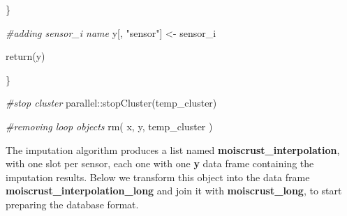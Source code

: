 \documentclass[
  table]{article}
\newenvironment{Shaded}{\begin{snugshade}}{\end{snugshade}}
\newcommand{\CommentTok}[1]{\textcolor[rgb]{0.56,0.35,0.01}{\textit{#1}}}
\newcommand{\FunctionTok}[1]{\textcolor[rgb]{0.00,0.00,0.00}{#1}}
\newcommand{\NormalTok}[1]{#1}
\newcommand{\OtherTok}[1]{\textcolor[rgb]{0.56,0.35,0.01}{#1}}
\newcommand{\SpecialCharTok}[1]{\textcolor[rgb]{0.00,0.00,0.00}{#1}}
\newcommand{\StringTok}[1]{\textcolor[rgb]{0.31,0.60,0.02}{#1}}
\begin{document}
\begin{Shaded}
\begin{Highlighting}[]
\NormalTok{  \}}
  
  \CommentTok{\#adding sensor\_i name}
\NormalTok{  y[, }\StringTok{"sensor"}\NormalTok{] }\OtherTok{\textless{}{-}}\NormalTok{ sensor\_i}
  
  \FunctionTok{return}\NormalTok{(y)}
  
\NormalTok{\}}

\CommentTok{\#stop cluster}
\NormalTok{parallel}\SpecialCharTok{::}\FunctionTok{stopCluster}\NormalTok{(temp\_cluster)}

\CommentTok{\#removing loop objects}
\FunctionTok{rm}\NormalTok{(}
\NormalTok{  x,}
\NormalTok{  y,}
\NormalTok{  temp\_cluster}
\NormalTok{)}
\end{Highlighting}
\end{Shaded}

The imputation algorithm produces a list named
\textbf{moiscrust\_interpolation}, with one slot per sensor, each one
with one \textbf{y} data frame containing the imputation results. Below
we transform this object into the data frame
\textbf{moiscrust\_interpolation\_long} and join it with
\textbf{moiscrust\_long}, to start preparing the database format.
\end{document}
